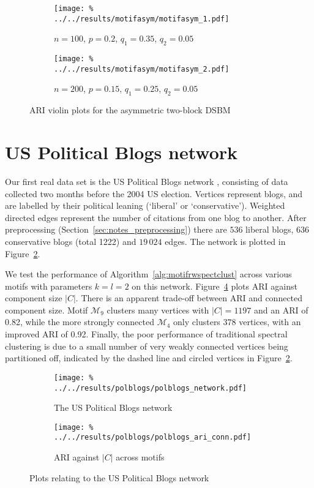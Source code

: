 \documentclass[12pt]{ociamthesis}
\theoremstyle{plain}
\theoremstyle{definition}
\theoremstyle{remark}
\newcommand\ca[1]{\mathcal{#1}}
\begin{document}
\begin{figure}[H]
  \begin{subfigure}{.49\textwidth}
    \centering
    \texttt{[image: \%
    ../../results/motifasym/motifasym\_1.pdf]}
    \caption{$n=100$, $p=0.2$, $q_1=0.35$, $q_2=0.05$}
  \end{subfigure}
  \begin{subfigure}{.49\textwidth}
    \centering
    \texttt{[image: \%
    ../../results/motifasym/motifasym\_2.pdf]}
    \caption{$n=200$, $p=0.15$, $q_1=0.25$, $q_2=0.05$}
  \end{subfigure}
  \caption{ARI violin plots for the asymmetric two-block DSBM}
  \label{fig:motifasym}
\end{figure}

\section{US Political Blogs network} \label{sec:motif_polblogs}

Our first real data set is the US Political Blogs network
\cite{adamic2005political}, consisting of data collected two months before the
2004 US election. Vertices represent blogs, and are labelled by their political
leaning (`liberal' or `conservative'). Weighted directed edges represent the
number of citations from one blog to another. After preprocessing
(Section~\ref{sec:notes_preprocessing}) there are $536$ liberal blogs, $636$
conservative blogs (total 1222) and $19 \, 024$ edges. The network is plotted
in Figure~\ref{fig:polblogs_network}.

We test the performance of Algorithm~\ref{alg:motifrwspectclust} across various
motifs with parameters $k=l=2$ on this network.
Figure~\ref{fig:polblogs_ariplot} plots ARI against component size $|C|$.
There is an apparent trade-off between ARI and connected component size.
Motif $\ca{M}_9$ clusters many vertices with $|C|=1197$ and an ARI of 0.82,
while the more strongly connected $\ca{M}_4$ only clusters $378$ vertices, with
an improved ARI of 0.92.
Finally, the poor performance of traditional spectral clustering is due to a
small number of very weakly connected vertices being partitioned off, indicated
by the dashed line and circled vertices in Figure~\ref{fig:polblogs_network}.

\vspace*{0.5cm}
\begin{figure}[H]
  \begin{subfigure}{.49\textwidth}
    \centering
    \texttt{[image: \%
    ../../results/polblogs/polblogs\_network.pdf]}
    \caption{The US Political Blogs network}
    \label{fig:polblogs_network}
  \end{subfigure}
  \begin{subfigure}{.49\textwidth}
    \centering
    \texttt{[image: \%
    ../../results/polblogs/polblogs\_ari\_conn.pdf]}
    \caption{ARI against $|C|$ across motifs}
    \label{fig:polblogs_ariplot}
  \end{subfigure}
  \caption{Plots relating to the US Political Blogs network}
\end{figure}
\end{document}
